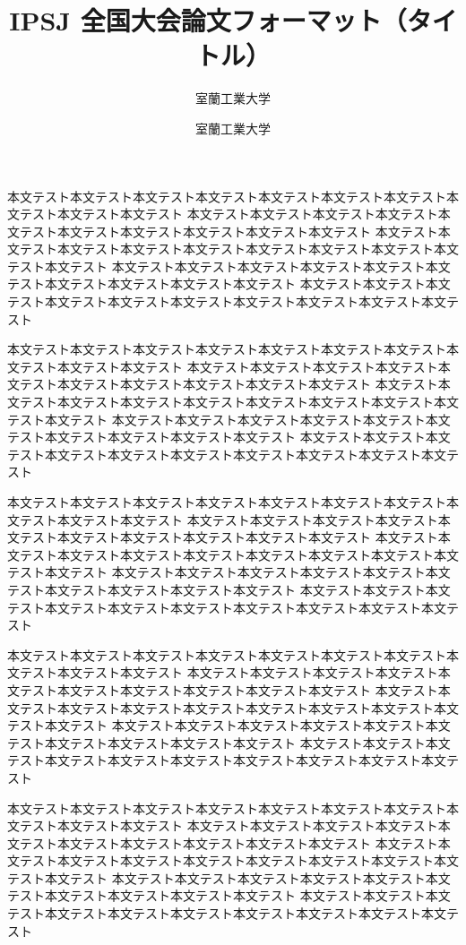 \documentclass[uplatex,dvipdfmx,a4paper,twocolumn,base=11pt,jbase=11pt,ja=standard]{bxjsarticle}
\title{IPSJ 全国大会論文フォーマット（タイトル）}{「タイトル」英文による記述}
\author{室蘭工業大学}{室蘭 太郎}{Taro Muroran, Muroran Institute of Technology}
\author{室蘭工業大学}{工業 太郎}{Taro Kogyo, Muroran Institute of Technology}
\begin{document}
\maketitle

本文テスト本文テスト本文テスト本文テスト本文テスト本文テスト本文テスト本文テスト本文テスト本文テスト
本文テスト本文テスト本文テスト本文テスト本文テスト本文テスト本文テスト本文テスト本文テスト本文テスト
本文テスト本文テスト本文テスト本文テスト本文テスト本文テスト本文テスト本文テスト本文テスト本文テスト
本文テスト本文テスト本文テスト本文テスト本文テスト本文テスト本文テスト本文テスト本文テスト本文テスト
本文テスト本文テスト本文テスト本文テスト本文テスト本文テスト本文テスト本文テスト本文テスト本文テスト

本文テスト本文テスト本文テスト本文テスト本文テスト本文テスト本文テスト本文テスト本文テスト本文テスト
本文テスト本文テスト本文テスト本文テスト本文テスト本文テスト本文テスト本文テスト本文テスト本文テスト
本文テスト本文テスト本文テスト本文テスト本文テスト本文テスト本文テスト本文テスト本文テスト本文テスト
本文テスト本文テスト本文テスト本文テスト本文テスト本文テスト本文テスト本文テスト本文テスト本文テスト
本文テスト本文テスト本文テスト本文テスト本文テスト本文テスト本文テスト本文テスト本文テスト本文テスト

本文テスト本文テスト本文テスト本文テスト本文テスト本文テスト本文テスト本文テスト本文テスト本文テスト
本文テスト本文テスト本文テスト本文テスト本文テスト本文テスト本文テスト本文テスト本文テスト本文テスト
本文テスト本文テスト本文テスト本文テスト本文テスト本文テスト本文テスト本文テスト本文テスト本文テスト
本文テスト本文テスト本文テスト本文テスト本文テスト本文テスト本文テスト本文テスト本文テスト本文テスト
本文テスト本文テスト本文テスト本文テスト本文テスト本文テスト本文テスト本文テスト本文テスト本文テスト

本文テスト本文テスト本文テスト本文テスト本文テスト本文テスト本文テスト本文テスト本文テスト本文テスト
本文テスト本文テスト本文テスト本文テスト本文テスト本文テスト本文テスト本文テスト本文テスト本文テスト
本文テスト本文テスト本文テスト本文テスト本文テスト本文テスト本文テスト本文テスト本文テスト本文テスト
本文テスト本文テスト本文テスト本文テスト本文テスト本文テスト本文テスト本文テスト本文テスト本文テスト
本文テスト本文テスト本文テスト本文テスト本文テスト本文テスト本文テスト本文テスト本文テスト本文テスト

本文テスト本文テスト本文テスト本文テスト本文テスト本文テスト本文テスト本文テスト本文テスト本文テスト
本文テスト本文テスト本文テスト本文テスト本文テスト本文テスト本文テスト本文テスト本文テスト本文テスト
本文テスト本文テスト本文テスト本文テスト本文テスト本文テスト本文テスト本文テスト本文テスト本文テスト
本文テスト本文テスト本文テスト本文テスト本文テスト本文テスト本文テスト本文テスト本文テスト本文テスト
本文テスト本文テスト本文テスト本文テスト本文テスト本文テスト本文テスト本文テスト本文テスト本文テスト
\end{document}
